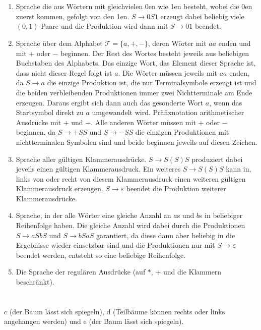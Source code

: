 \documentclass[a4paper,10pt]{scrartcl}
\begin{document}
\section{}
\begin{enumerate}
 \item	Sprache die aus Wörtern mit gleichvielen 0en wie 1en besteht, wobei die
0en zuerst kommen, gefolgt von den 1en. 
	$S \to 0S1$ erzeugt dabei beliebig viele $(0,1)$-Paare und die
Produktion wird dann mit $S \to 01$ beendet.
 \item	Sprache über dem Alphabet $\mathcal{T} = \{a,
	+, -\}$, deren Wörter mit $aa$ enden und mit $+$ oder $-$
  beginnen.
	Der Rest des Wortes besteht jeweils aus beliebigen Buchstaben des
  Alphabets.
	Das einzige Wort, das Element dieser Sprache ist, dass nicht dieser
Regel folgt ist $a$.
	Die Wörter müssen jeweils mit $aa$ enden, da $S \to a$ die einzige
	Produktion ist, die nur Terminalsymbole erzeugt ist und die beiden
	verbleibenden Produktionen immer zwei Nichtterminale am Ende erzeugen.
	Daraus ergibt sich dann auch das gesonderte Wort $a$, wenn das
Startsymbol direkt zu $a$ umgewandelt wird. 
	Präfixnotation arithmetischer Ausdrücke mit $+$ und $-$.
Alle anderen Wörter müssen mit $+$ oder $-$ beginnen, da $S \to +SS$
und $S \to -SS$ die einzigen Produktionen mit nichtterminalen Symbolen sind
 und beide beginnen jeweils auf diesen Zeichen.
 \item	Sprache aller gültigen Klammerausdrücke. $S \to S (S) S$ produziert
dabei jeveils einen gültigen Klammerausdruck. Ein weiteres $S \to S (S) S$ kann
in, links von oder recht von diesem Klammerausdruck einen weiteren gültigen
Klammerausdruck erzeugen. $S \to \varepsilon$ beendet die Produktion weiterer
Klammerausdrücke.
 \item	Sprache, in der alle Wörter eine gleiche Anzahl an $a$s und $b$s in
beliebiger Reihenfolge haben. Die gleiche Anzahl wird dabei durch die
Produktionen $S \to aSbS$ und $S \to bSaS$ garantiert, da diese dann aber
beliebig in die Ergebnisse wieder einsetzbar sind und die Produktionen nur mit
$S \to \varepsilon$ beendet werden, entsteht so eine beliebige Reihenfolge.
 \item	Die Sprache der regulären Ausdrücke (auf $*$, $+$ und die Klammern beschränkt).
\end{enumerate}

\section{}
c (der Baum lässt sich spiegeln), d (Teilbäume können rechts oder links angehangen werden) und e (der Baum lässt sich spiegeln).
\end{document}
